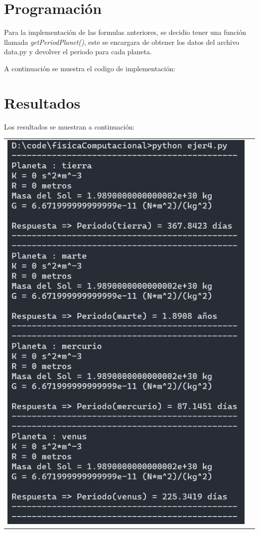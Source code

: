 \documentclass[a4paper,12pt]{article}
\begin{document}
    \section{Programación}
    Para la implementación de las formulas anteriores, se decidio tener una función llamada 
    \emph{getPeriodPlanet()}, este se encargara de obtener los datos del archivo data.py y devolver
    el periodo para cada planeta.

    A continuación se muestra el codigo de implementación:
    \section{Resultados}
    Los resultados se muestran a continuación:
    \begin{table}[!htbp]
        \centering
        \begin{tabular}{cc}
            \begin{minipage}{.3\textwidth}
                \includegraphics[width=\linewidth]{e4_1}

\end{minipage}
\end{tabular}
\end{table}
\end{document}
